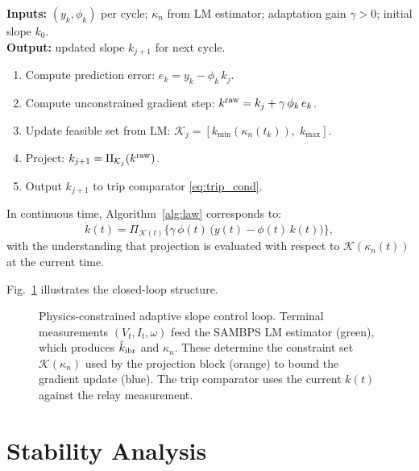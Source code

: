 \documentclass[journal]{IEEEtran}
\newcommand{\kappan}{\kappa_{n}}
\newcommand{\kmin}{k_{\min}}
\newcommand{\kmax}{k_{\max}}
\newcommand{\Proj}[1]{\Pi_{#1}}
\newcommand{\calK}{\mathcal{K}}
\begin{document}
\begin{algorithm}[!t]
\caption{Physics-Constrained Projected-Gradient Adaptive Law}
\label{alg:law}
\textbf{Inputs:} $(y_k, \phi_k)$ per cycle; $\kappan$ from LM estimator;
adaptation gain $\gamma > 0$; initial slope $k_0$.\\
\textbf{Output:} updated slope $k_{j+1}$ for next cycle.
\begin{enumerate}
  \item Compute prediction error: $e_k = y_k - \phi_k\,k_j$.
  \item Compute unconstrained gradient step:
        $k^{\rm raw} = k_j + \gamma\,\phi_k\,e_k$.
  \item Update feasible set from LM:
        $\calK_j = [\kmin(\kappan(t_k)),\;\kmax]$.
  \item Project: $k_{j+1} = \Proj{\calK_j}(k^{\rm raw})$.
  \item Output $k_{j+1}$ to trip comparator \eqref{eq:trip_cond}.
\end{enumerate}
\end{algorithm}

In continuous time, Algorithm~\ref{alg:law} corresponds to:
\begin{equation}
  \dot{k}(t) = \Proj{\calK(t)}\!\bigl\{
    \gamma\,\phi(t)\,\bigl(y(t) - \phi(t)\,k(t)\bigr)
  \bigr\},
  \label{eq:law_ct}
\end{equation}
with the understanding that projection is evaluated with respect to
$\calK(\kappan(t))$ at the current time.

Fig.~\ref{fig:adaptive_block} illustrates the closed-loop structure.

\begin{figure}[!t]
  \centering
  
  \caption{Physics-constrained adaptive slope control loop.  Terminal
           measurements $(V_t,I_t,\omega)$ feed the SAMBPS LM estimator
           (green), which produces $\hat{k}_{\rm ibr}$ and $\kappan$.
           These determine the constraint set $\calK(\kappan)$ used
           by the projection block (orange) to bound the gradient update
           (blue).  The trip comparator uses the current $k(t)$ against
           the relay measurement.}
  \label{fig:adaptive_block}
\end{figure}

\section{Stability Analysis}
\label{sec:stability}
\end{document}
